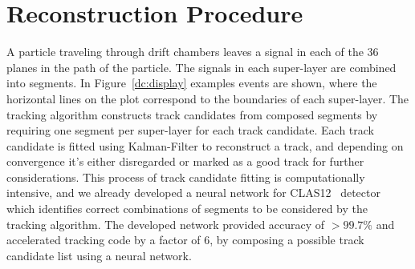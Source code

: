 \documentclass[12pt]{article}
\begin{document}
\section{Reconstruction Procedure}

\indent

A particle traveling through drift chambers leaves a signal in each of the 36 planes in the path of the particle. The signals in each super-layer are combined into segments. In Figure~\ref{dc:display} examples events are shown, where the horizontal lines on the plot correspond to the boundaries of each super-layer. The tracking algorithm constructs track candidates from composed segments by requiring one segment per super-layer for each track candidate. Each track candidate is fitted using Kalman-Filter to reconstruct a track, and depending on convergence it's either disregarded or marked as a good track for further considerations. This process of track candidate fitting is computationally intensive, and we already developed a neural network for CLAS12~\cite{Gavalian:2020oxg} detector which identifies correct combinations of segments to be considered by the tracking algorithm. The developed network provided accuracy of $>99.7\%$ and accelerated tracking code by a factor of 6, by composing a possible track candidate list using a neural network.
\end{document}
